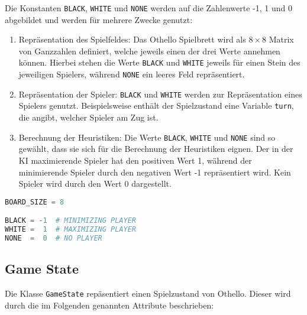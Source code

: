 Die Konstanten \passthrough{\lstinline!BLACK!},
\passthrough{\lstinline!WHITE!} und \passthrough{\lstinline!NONE!}
werden auf die Zahlenwerte -1, 1 und 0 abgebildet und werden für mehrere
Zwecke genutzt:

\begin{enumerate}
\def\labelenumi{\arabic{enumi}.}
\tightlist
\item
  Repräsentation des Spielfeldes: Das Othello Spielbrett wird als
  \(8\times 8\) Matrix von Ganzzahlen definiert, welche jeweils einen
  der drei Werte annehmen können. Hierbei stehen die Werte
  \passthrough{\lstinline!BLACK!} und \passthrough{\lstinline!WHITE!}
  jeweils für einen Stein des jeweiligen Spielers, während
  \passthrough{\lstinline!NONE!} ein leeres Feld repräsentiert.
\item
  Repräsentation der Spieler: \passthrough{\lstinline!BLACK!} und
  \passthrough{\lstinline!WHITE!} werden zur Repräsentation eines
  Spielers genutzt. Beispielsweise enthält der Spielzustand eine
  Variable \passthrough{\lstinline!turn!}, die angibt, welcher Spieler
  am Zug ist.
\item
  Berechnung der Heuristiken: Die Werte \passthrough{\lstinline!BLACK!},
  \passthrough{\lstinline!WHITE!} und \passthrough{\lstinline!NONE!}
  sind so gewählt, dass sie sich für die Berechnung der Heuristiken
  eignen. Der in der \ac{KI} maximierende Spieler hat den positiven Wert
  1, während der minimierende Spieler durch den negativen Wert -1
  repräsentiert wird. Kein Spieler wird durch den Wert 0 dargestellt.
\end{enumerate}

\begin{lstlisting}[language=Python]
BOARD_SIZE = 8

BLACK = -1  # MINIMIZING PLAYER
WHITE =  1  # MAXIMIZING PLAYER
NONE  =  0  # NO PLAYER
\end{lstlisting}

\hypertarget{game-state}{%
\subsection{Game State}\label{game-state}}

Die Klasse \passthrough{\lstinline!GameState!} repäsentiert einen
Spielzustand von Othello. Dieser wird durch die im Folgenden genannten
Attribute beschrieben:

